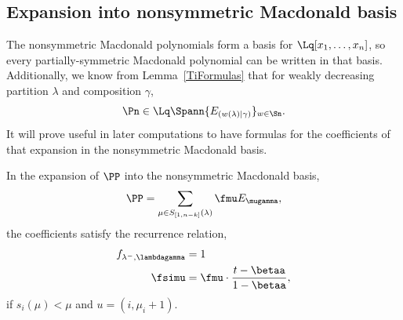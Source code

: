 \subsection{Expansion into nonsymmetric Macdonald basis}
The nonsymmetric Macdonald polynomials form a basis for $\Lq[x_1, \dotsc, x_n]$, so every partially-symmetric Macdonald polynomial can be written in that basis. Additionally, we know from Lemma~\ref{TiFormulas} that for weakly decreasing partition $\lambda$ and composition $\gamma$,
\[ \Pn \in \Lq \Spann \{ E_{(w(\lambda) \mid \gamma)}\}_{w\in \Sn }.\]
It will prove useful in later computations to have formulas for the coefficients of that expansion in the nonsymmetric Macdonald basis.


\begin{prop}\label{Pexpansion}
In the expansion of $\PP$ into the nonsymmetric Macdonald basis,
\[ \PP = \sum_{\mu \in S_{[1,n-k]}(\lambda)} \fmu E_{\mugamma},\]
the coefficients satisfy the recurrence relation,
\begin{align} 
f_{\lambda^-,\lambdagamma} &= 1 \label{identity}\\
\fsimu &= \fmu \cdot \frac{t-\betaa}{1-\betaa},\label{recursion}\end{align}
if $s_i(\mu) < \mu$ and $u=(i, \mu_{i}+1)$.
\end{prop}
